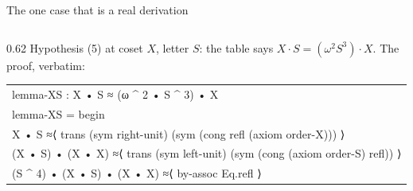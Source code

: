 \begin{frame}{The one case that is a real derivation \InPaper}
\begin{columns}[c]
\begin{column}{0.62\textwidth}
\small Hypothesis (5) at coset $X$, letter $S$: the table says
$X\cdot S = (\omega^2 S^3)\cdot X$. The proof, verbatim:
\vspace{2pt}

{\agdafont\scriptsize
\begin{tabular}{@{}l@{}}
\textcolor{AgdaFunction}{lemma-XS} : \textcolor{AgdaFunction}{X} \textcolor{AgdaInductiveConstructor}{•} \textcolor{AgdaFunction}{S} \textcolor{AgdaDatatype}{≈} (\textcolor{AgdaFunction}{ω} \textcolor{AgdaFunction}{\textasciicircum} 2 \textcolor{AgdaInductiveConstructor}{•} \textcolor{AgdaFunction}{S} \textcolor{AgdaFunction}{\textasciicircum} 3) \textcolor{AgdaInductiveConstructor}{•} \textcolor{AgdaFunction}{X}\\
\textcolor{AgdaFunction}{lemma-XS} = \textcolor{AgdaFunction}{begin}\\
\quad \textcolor{AgdaFunction}{X} \textcolor{AgdaInductiveConstructor}{•} \textcolor{AgdaFunction}{S} \textcolor{AgdaFunction}{≈⟨} \textcolor{AgdaInductiveConstructor}{trans} (\textcolor{AgdaInductiveConstructor}{sym} \textcolor{AgdaInductiveConstructor}{right-unit}) (\textcolor{AgdaInductiveConstructor}{sym} (\textcolor{AgdaInductiveConstructor}{cong} \textcolor{AgdaInductiveConstructor}{refl} (\textcolor{AgdaInductiveConstructor}{axiom} \textcolor{AgdaInductiveConstructor}{order-X}))) \textcolor{AgdaFunction}{⟩}\\
\quad (\textcolor{AgdaFunction}{X} \textcolor{AgdaInductiveConstructor}{•} \textcolor{AgdaFunction}{S}) \textcolor{AgdaInductiveConstructor}{•} (\textcolor{AgdaFunction}{X} \textcolor{AgdaInductiveConstructor}{•} \textcolor{AgdaFunction}{X}) \textcolor{AgdaFunction}{≈⟨} \textcolor{AgdaInductiveConstructor}{trans} (\textcolor{AgdaInductiveConstructor}{sym} \textcolor{AgdaInductiveConstructor}{left-unit}) (\textcolor{AgdaInductiveConstructor}{sym} (\textcolor{AgdaInductiveConstructor}{cong} (\textcolor{AgdaInductiveConstructor}{axiom} \textcolor{AgdaInductiveConstructor}{order-S}) \textcolor{AgdaInductiveConstructor}{refl})) \textcolor{AgdaFunction}{⟩}\\
\quad (\textcolor{AgdaFunction}{S} \textcolor{AgdaFunction}{\textasciicircum} 4) \textcolor{AgdaInductiveConstructor}{•} (\textcolor{AgdaFunction}{X} \textcolor{AgdaInductiveConstructor}{•} \textcolor{AgdaFunction}{S}) \textcolor{AgdaInductiveConstructor}{•} (\textcolor{AgdaFunction}{X} \textcolor{AgdaInductiveConstructor}{•} \textcolor{AgdaFunction}{X}) \textcolor{AgdaFunction}{≈⟨} \textcolor{AgdaFunction}{by-assoc} \textcolor{AgdaInductiveConstructor}{Eq.refl} \textcolor{AgdaFunction}{⟩}\\

\end{tabular}}
\end{column}
\end{columns}
\end{frame}
